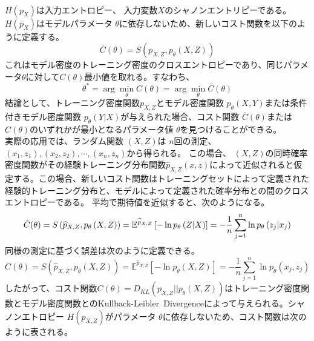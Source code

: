 \documentclass[a4paper]{jsarticle}%
\begin{document}
\, \\
$ H \left(p_X\right) $は入力エントロピー、 \ie 入力変数$X$のシャノンエントリピーである。 $ H \left(p_X\right) $はモデルパラメータ $ \theta $に依存しないため、新しいコスト関数を以下のように定義する。
$$ \overline{C}(\theta) = S(p_{X,Z}, p_\theta(X,Z)) $$
これはモデル密度のトレーニング密度のクロスエントロピーであり、同じパラメータ$\theta$に対して$C \left(\theta\right)$最小値を取れる。すなわち、
\begin{equation*}
  \theta^* = \arg\min_{\theta} C \left(\theta\right) = \arg\min_{\theta} \overline{C}(\theta)
\end{equation*}
結論として、トレーニング密度関数$p_{X,Z}$とモデル密度関数 $ p_{\theta} \left(X,Y\right) $または条件付きモデル密度関数 $ p_{\theta} \left(Y|X\right) $が与えられた場合、コスト関数 $ \overline{C} \left(\theta\right) $または $ C \left(\theta\right) $のいずれかが最小となるパラメータ値 $ \theta $を見つけることができる。\\
実際の応用では、ランダム関数 $ \left(X,Z\right) $は $ n $回の測定、 $ \left(x_1,z_1\right), \left(x_2,z_2\right),\cdots , \left(x_n,z_n\right) $から得られる。
この場合、 $ \left(X,Z\right) $の同時確率密度関数がその経験トレーニング分布関数\footnotemark[8] $ \widehat{p}_{X,Z} \left(x,z\right) $によって近似されると仮定する。この場合、新しいコスト関数はトレーニングセットによって定義された経験的トレーニング分布と、モデルによって定義された確率分布との間のクロスエントロピーである。
平均で期待値を近似すると、次のようになる。
\begin{equation}
  \tilde{C}(\theta) = S \left(\widehat{p}_{X,Z}, p_\theta \left(X,Z\right)\right) = \mathbb{E}^{\widehat{p}_{X,Z}} \left[-\ln p_\theta \left(Z|X\right)\right] = -\dfrac{1}{n}\sum_{j=1}^{n} \ln p_\theta \left(z_j|x_j\right) \notag\label{eq3}
\end{equation}
同様の測定に基づく誤差は次のように定義できる。
\begin{equation}
  \widehat{C}(\theta) = S \left(\widehat{p}_{X,Z}, p_{\theta} \left(X,Z\right)\right) = \mathbb{E}^{\widehat{p}_{X,Z}} \left[-\ln p_{\theta} \left(X,Z\right)\right] = -\dfrac{1}{n}\sum_{j=1}^{n} \ln p_{\theta} \left(x_j,z_j\right)\label{eq4}
\end{equation}
したがって、コスト関数$C \left(\theta\right) = D_{KL} \left(p_{X,Z}||p_{\theta} \left(X,Z\right)\right)$はトレーニング密度関数とモデル密度関数とのKullback-Leibler\ Divergenceによって与えられる。シャノンエトロピー $ H \left(p_{X,Z}\right) $がパラメータ $ \theta $に依存しないため、コスト関数は次のように表される。
\end{document}
